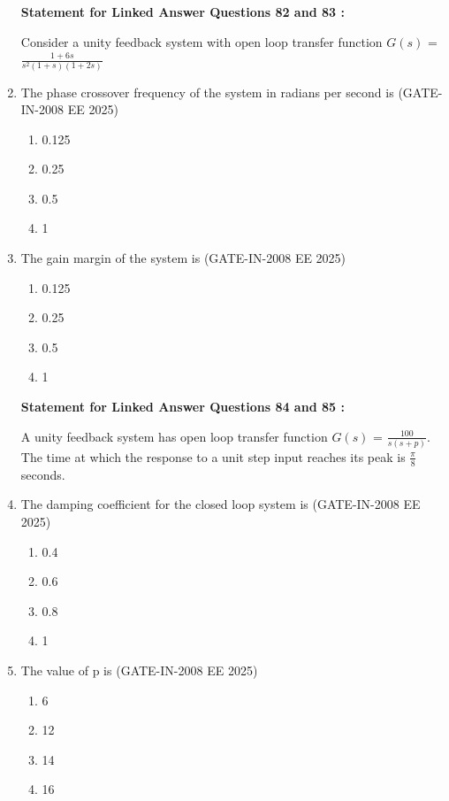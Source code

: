 \documentclass[journal,12pt,onecolumn]{IEEEtran}
\theoremstyle{remark}
\begin{document}
\begin{enumerate}[label=Q.\arabic*,start=1]
\textbf{Statement for Linked Answer Questions 82 and 83 :}

Consider a unity feedback system with open loop transfer function $G(s)$ = $\frac{1+ 6s}{s^2(1+s)(1+2s)}$



\item The phase crossover frequency of the system in radians per second is (GATE-IN-2008 EE 2025)
           \begin{enumerate} 
              \item 0.125            
              \item 0.25
              \item 0.5
              \item 1
            \end{enumerate}

\item The gain margin of the system is (GATE-IN-2008 EE 2025)
           \begin{enumerate} 
              \item  0.125          
              \item  0.25
              \item  0.5
              \item  1
            \end{enumerate}

\textbf{Statement for Linked Answer Questions 84 and 85 :}

A unity feedback system has open loop transfer function $G(s)$ = $\frac{100}{s(s+p)}$. The time at which the
response to a unit step input reaches its peak is $\frac{\pi}{8}$ seconds.




\item The damping coefficient for the closed loop system is (GATE-IN-2008 EE 2025)
           \begin{enumerate} 
              \item  0.4      
              \item  0.6
              \item  0.8
              \item  1
            \end{enumerate}


\item The value of p is (GATE-IN-2008 EE 2025)
           \begin{enumerate} 
              \item 6           
              \item 12
              \item 14
              \item 16
            \end{enumerate}



\end{enumerate}
\end{document}
